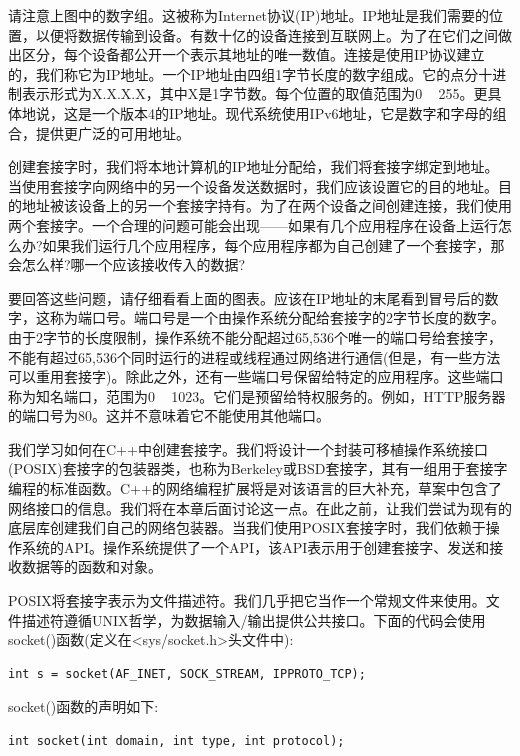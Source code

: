请注意上图中的数字组。这被称为Internet协议(IP)地址。IP地址是我们需要的位置，以便将数据传输到设备。有数十亿的设备连接到互联网上。为了在它们之间做出区分，每个设备都公开一个表示其地址的唯一数值。连接是使用IP协议建立的，我们称它为IP地址。一个IP地址由四组1字节长度的数字组成。它的点分十进制表示形式为X.X.X.X，其中X是1字节数。每个位置的取值范围为0 ~ 255。更具体地说，这是一个版本4的IP地址。现代系统使用IPv6地址，它是数字和字母的组合，提供更广泛的可用地址。 \par
创建套接字时，我们将本地计算机的IP地址分配给，我们将套接字绑定到地址。当使用套接字向网络中的另一个设备发送数据时，我们应该设置它的目的地址。目的地址被该设备上的另一个套接字持有。为了在两个设备之间创建连接，我们使用两个套接字。一个合理的问题可能会出现——如果有几个应用程序在设备上运行怎么办?如果我们运行几个应用程序，每个应用程序都为自己创建了一个套接字，那会怎么样?哪一个应该接收传入的数据? \par
要回答这些问题，请仔细看看上面的图表。应该在IP地址的末尾看到冒号后的数字，这称为端口号。端口号是一个由操作系统分配给套接字的2字节长度的数字。由于2字节的长度限制，操作系统不能分配超过65,536个唯一的端口号给套接字，不能有超过65,536个同时运行的进程或线程通过网络进行通信(但是，有一些方法可以重用套接字)。除此之外，还有一些端口号保留给特定的应用程序。这些端口称为知名端口，范围为0 ~ 1023。它们是预留给特权服务的。例如，HTTP服务器的端口号为80。这并不意味着它不能使用其他端口。 \par
我们学习如何在C++中创建套接字。我们将设计一个封装可移植操作系统接口(POSIX)套接字的包装器类，也称为Berkeley或BSD套接字，其有一组用于套接字编程的标准函数。C++的网络编程扩展将是对该语言的巨大补充，草案中包含了网络接口的信息。我们将在本章后面讨论这一点。在此之前，让我们尝试为现有的底层库创建我们自己的网络包装器。当我们使用POSIX套接字时，我们依赖于操作系统的API。操作系统提供了一个API，该API表示用于创建套接字、发送和接收数据等的函数和对象。 \par
POSIX将套接字表示为文件描述符。我们几乎把它当作一个常规文件来使用。文件描述符遵循UNIX哲学，为数据输入/输出提供公共接口。下面的代码会使用socket()函数(定义在<sys/socket.h>头文件中): \par

\begin{lstlisting}[caption={}]
int s = socket(AF_INET, SOCK_STREAM, IPPROTO_TCP);
\end{lstlisting}

socket()函数的声明如下: \par

\begin{lstlisting}[caption={}]
int socket(int domain, int type, int protocol);
\end{lstlisting}

